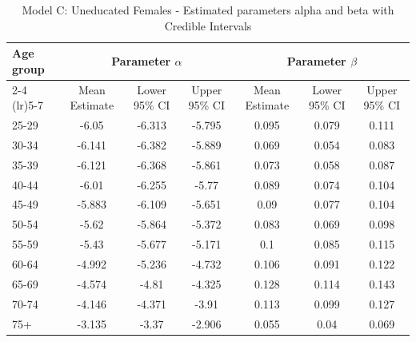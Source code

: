 \begin{landscape}
\begin{table}[htbp]
\centering
\caption{Model C: Uneducated Females - Estimated parameters alpha and beta  with Credible Intervals}
\label{tab:parameters_ab17}
\begin{tabular}{@{}lcccccc@{}}
\toprule
Age group & \multicolumn{3}{c}{Parameter \(\alpha\)} & \multicolumn{3}{c}{Parameter \(\beta\)} \\ 
\cmidrule(lr){2-4} \cmidrule(lr){5-7}
          & Mean Estimate & Lower 95\% CI & Upper 95\% CI & Mean Estimate & Lower 95\% CI & Upper 95\% CI \\ 
\midrule
25-29 & -6.05 & -6.313 & -5.795 & 0.095 & 0.079 & 0.111 \\
30-34 & -6.141 & -6.382 & -5.889 & 0.069 & 0.054 & 0.083 \\
35-39 & -6.121 & -6.368 & -5.861 & 0.073 & 0.058 & 0.087 \\
40-44 & -6.01 & -6.255 & -5.77 & 0.089 & 0.074 & 0.104 \\
45-49 & -5.883 & -6.109 & -5.651 & 0.09 & 0.077 & 0.104 \\
50-54 & -5.62 & -5.864 & -5.372 & 0.083 & 0.069 & 0.098 \\
55-59 & -5.43 & -5.677 & -5.171 & 0.1 & 0.085 & 0.115 \\
60-64 & -4.992 & -5.236 & -4.732 & 0.106 & 0.091 & 0.122 \\
65-69 & -4.574 & -4.81 & -4.325 & 0.128 & 0.114 & 0.143 \\
70-74 & -4.146 & -4.371 & -3.91 & 0.113 & 0.099 & 0.127 \\
75+ & -3.135 & -3.37 & -2.906 & 0.055 & 0.04 & 0.069 \\
\bottomrule
\end{tabular}
\end{table}
\end{landscape}